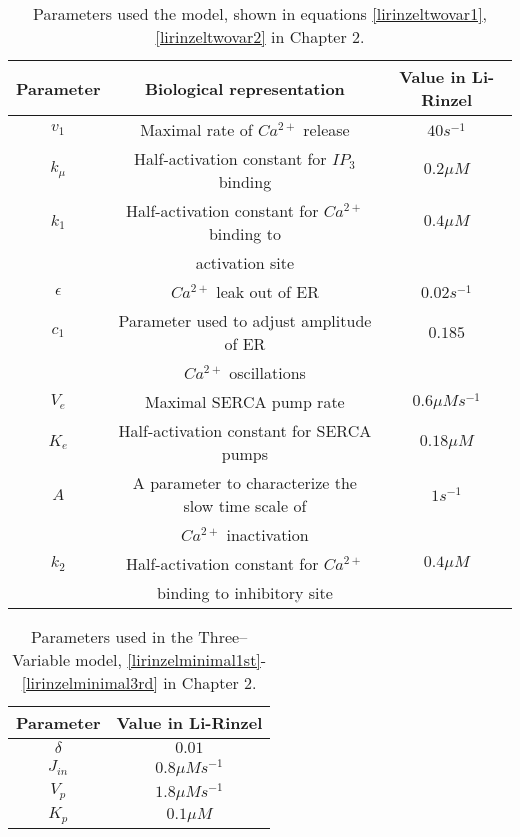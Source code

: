 \begin{table}[h!!!t!!!b!!!p]
\begin{center}
\begin{tabular}{ c c c }
Parameter & Biological representation & Value in Li-Rinzel\\
\hline
 $v_1$ & Maximal rate of $Ca^{2+}$ release & $40s^{-1}$\\
 \hline
 $k_{\mu}$ & Half-activation constant for $IP_3$ binding & $0.2\mu M$\\
 \hline
 $k_1$ & Half-activation constant for $Ca^{2+}$ binding to & $0.4\mu M$\\
 & activation site & \\
 \hline
 $\epsilon$ & $Ca^{2+}$ leak out of ER & $0.02s^{-1}$\\
 \hline
 $c_1$ & Parameter used to adjust amplitude of ER &$0.185$\\
 & $Ca^{2+}$ oscillations & \\
 \hline
 $V_e$ & Maximal SERCA pump rate &$0.6\mu Ms^{-1}$\\
 \hline
 $K_e$ & Half-activation constant for SERCA pumps & $0.18\mu M$\\
 \hline
 $A$ & A parameter to characterize the slow time scale of & $1s^{-1}$\\
 &  $Ca^{2+}$ inactivation & \\
 \hline
 $k_2$ & Half-activation constant for $Ca^{2+}$ & $0.4\mu M$\\
 & binding to inhibitory site & \\
\end{tabular}
\end{center}
\caption{Parameters used the  model, shown in equations \eqref{lirinzeltwovar1}, \eqref{lirinzeltwovar2} in Chapter 2. }\label{twovarminmodelparam}
\end{table}

\begin{table}[h!!!t!!!b!!!p]
\begin{center}
\begin{tabular}{ c c }
Parameter & Value in Li-Rinzel\\
 \hline
 $\delta$ & $0.01$\\
 \hline
 $J_{in}$ & $0.8\mu Ms^{-1}$\\
 \hline
 $V_p$ & $1.8 \mu Ms^{-1}$\\
 \hline
 $K_p$ & $0.1\mu M$\\
\end{tabular}
\end{center}
\caption{Parameters used in the  Three--Variable model, \eqref{lirinzelminimal1st}-\eqref{lirinzelminimal3rd} in Chapter 2.}\label{lirinzelminimaltable}
\end{table}

